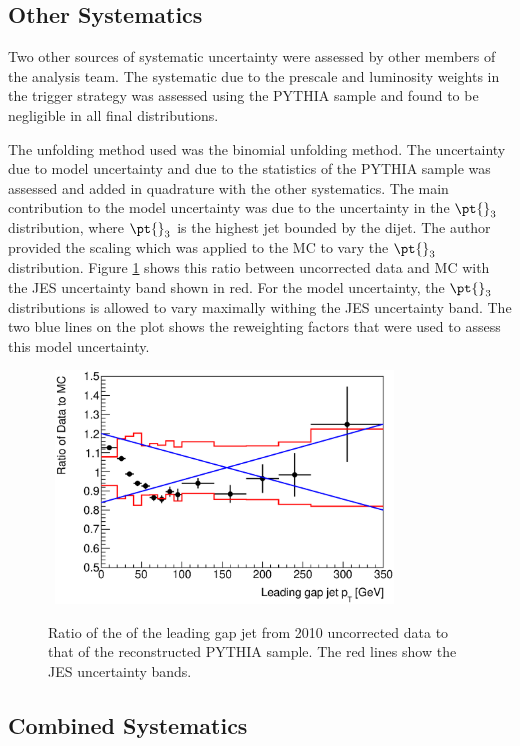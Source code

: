 \subsection {Other Systematics}
Two other sources of systematic uncertainty were assessed  by other members of the analysis team.
The systematic due to the prescale and luminosity weights in the trigger strategy  was assessed using the PYTHIA sample and found to be negligible in all final distributions.

The unfolding method used was the binomial unfolding method.
The uncertainty due to model uncertainty and due to the statistics of the PYTHIA sample was assessed and added in quadrature with the other systematics. 
The main contribution to the model uncertainty was due to the uncertainty in the $\pt{}_3$ distribution, where $\pt{}_3$ is the highest \pt{} jet bounded by the dijet. 
The author provided the scaling which was applied to the MC to vary the $\pt{}_3$ distribution.
Figure \ref{GBJ2:Uncorr:pt3} shows this ratio between uncorrected data and MC with the JES uncertainty band shown in red.
For the model uncertainty, the $\pt{}_3$ distributions is allowed to vary maximally withing the JES uncertainty band.
The two blue lines on the plot shows the reweighting factors that were used to assess this model uncertainty.
\begin{figure}
\centering
\mbox{
   \includegraphics[width=0.8\textwidth]{figures/GBJ2/ControlPlots/Ratio___pt3.eps}
}
\caption[]{
Ratio of the \pt{} of the leading gap jet from 2010 uncorrected data to that of the reconstructed PYTHIA sample.
The red lines show the JES uncertainty bands.
\label{GBJ2:Uncorr:pt3}}
\end{figure}


\subsection{Combined Systematics}
\label{sec:GBJ2:SysComb}

